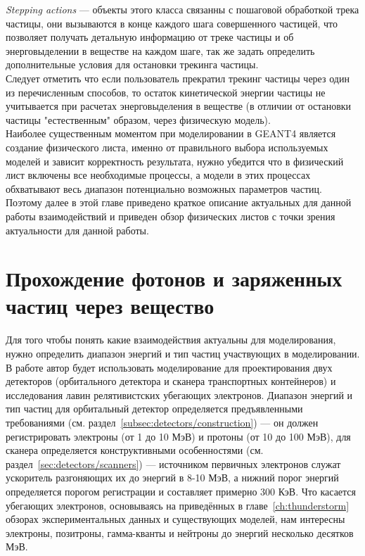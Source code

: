 \textit{Stepping actions} --- объекты этого класса связанны с пошаговой обработкой трека частицы, они вызываются в конце каждого шага совершенного частицей, что позволяет  получать детальную информацию от треке частицы и об энерговыделении в веществе на каждом шаге, так же задать определить дополнительные условия для остановки трекинга частицы.\\
Следует отметить что если пользователь прекратил трекинг частицы через один из перечисленным способов, то остаток кинетической энергии частицы не учитывается при расчетах энерговыделения в веществе (в отличии от остановки частицы "естественным" образом, через физическую модель).\\
Наиболее существенным моментом при моделировании в GEANT4 является создание физического листа, именно от правильного выбора используемых моделей и зависит корректность результата, нужно убедится что в физический лист включены
все необходимые процессы, а модели в этих процессах обхватывают весь диапазон потенциально возможных параметров частиц. Поэтому далее в этой главе  приведено краткое описание актуальных для данной работы взаимодействий и приведен обзор физических листов с точки зрения актуальности для данной работы.

\section{Прохождение фотонов и заряженных частиц через вещество}\label{sec:theory/propagation}
Для того чтобы понять какие взаимодействия актуальны для моделирования, нужно определить диапазон энергий и тип частиц участвующих в моделировании. В работе автор будет использовать моделирование для проектирования двух детекторов (орбитального детектора и сканера транспортных контейнеров) и исследования лавин релятивистских убегающих электронов. Диапазон энергий и тип частиц для  орбитальный детектор определяется предъявленными требованиями (см. раздел~\ref{subsec:detectors/construction}) --- он должен регистрировать электроны (от 1 до 10 МэВ) и протоны (от 10 до 100 МэВ), для сканера определяется конструктивными особенностями (см. раздел~\ref{sec:detectors/scanners}) --- источником первичных электронов служат ускоритель разгоняющих их до энергий в 8-10 МэВ, а нижний порог энергий определяется порогом регистрации и составляет примерно 300 КэВ. Что касается убегающих электронов, основываясь на приведённых в главе~\ref{ch:thunderstorm} обзорах экспериментальных данных и существующих моделей, нам интересны электроны, позитроны, гамма-кванты и нейтроны до энергий несколько десятков МэВ.

